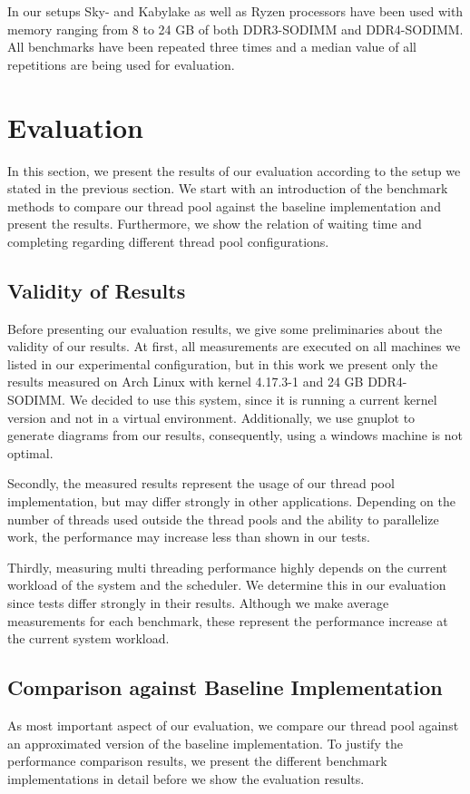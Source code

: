 \documentclass[conference]{IEEEtran}
\begin{document}
In our setups Sky- and Kabylake as well as Ryzen processors have been used with memory
ranging from 8 to 24 GB of both DDR3-SODIMM and DDR4-SODIMM. 
All benchmarks have been repeated three times and a median value of all
repetitions are being used for evaluation.

\section{Evaluation}\label{sec:eval}
In this section, we present the results of our evaluation according to the setup we stated in the previous section. We start with an introduction of the benchmark methods to compare our thread pool against the baseline implementation and present the results. Furthermore, we show the relation of waiting time and completing regarding different thread pool configurations.

\subsection{Validity of Results} 
Before presenting our evaluation results, we
give some preliminaries about the validity of our results. At first, all
measurements are executed on all machines we listed in our experimental
configuration, but in this work we present only the results measured on
Arch Linux with kernel 4.17.3-1 and 24 GB DDR4-SODIMM. We decided to use this
system, since it is running a current kernel version and not in a virtual
environment. Additionally, we use gnuplot to generate diagrams from our results,
consequently, using a windows machine is not optimal.

Secondly, the measured results represent the usage of our thread pool implementation, but may differ strongly in other applications. Depending on the number of threads used outside the thread pools and the ability to parallelize work, the performance may increase less than shown in our tests.

Thirdly, measuring multi threading performance highly depends on the current workload of the system and the scheduler. We determine this in our evaluation since tests differ strongly in their results. Although we make average measurements for each benchmark, these represent the performance increase at the current system workload.

\subsection{Comparison against Baseline Implementation}
As most important aspect of our evaluation, we compare our thread pool against an approximated version of the baseline implementation. To justify the performance comparison results, we present the different benchmark implementations in detail before we show the evaluation results.
\end{document}
